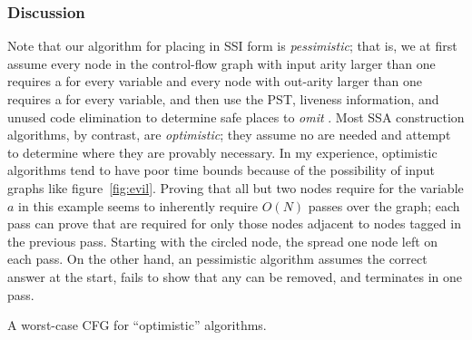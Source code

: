\documentclass[12pt,titlepage,twoside]{article}
\newcommand*{\figscale}{1.0}
\begin{document}
\subsubsection{Discussion}
Note that our algorithm for placing  in
SSI form is
\emph{pessimistic}; that is, we at first assume every node in the
control-flow graph with input arity larger than one requires a
\phifunction{} for every variable and every node with out-arity larger
than one requires a \sigfunction{} for every variable, and then use
the PST, liveness information, and unused code elimination to
determine safe places to
\emph{omit} .  Most SSA construction
algorithms, by contrast, are \emph{optimistic}; they assume no
 are needed and attempt to determine where
they are provably necessary.  In my experience, optimistic algorithms tend to
have poor time bounds because of the possibility of input graphs like
figure~\vref{fig:evil}.  Proving that all but two nodes require
 for the variable $a$ in this example seems to
inherently require $O(N)$ passes over the graph; each pass can prove
that  are required for only those nodes adjacent to
nodes tagged in the previous pass.  Starting with the circled node, the
 spread one node left on each pass. On the other hand,
an pessimistic algorithm assumes the correct answer at the start, fails
to show that any  can be removed, and
terminates in one pass.

\begin{myfigure}[t]
\centering\renewcommand*{\figscale}{0.25}
\caption{A worst-case CFG for ``optimistic'' algorithms.}
\label{fig:evil}
\end{myfigure}
\end{document}
